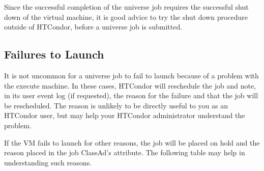 Since the successful completion of the  universe job
requires the successful shut down of the virtual machine,
it is good advice to try the shut down procedure outside of
HTCondor, before a  universe job is submitted.

\subsection{\label{sec:vm-ftl}Failures to Launch}

It is not uncommon for a  universe job to fail to launch
because of a problem with the execute machine.  In these cases, HTCondor
will reschedule the job and note, in its user event log (if requested),
the reason for the failure and that the job will be rescheduled.  The
reason is unlikely to be directly useful to you as an HTCondor user, but
may help your HTCondor administrator understand the problem.

If the VM fails to launch for other reasons, the job will be placed on hold
and the reason placed in the job ClassAd's  attribute.
The following table may help in understanding such reasons.

